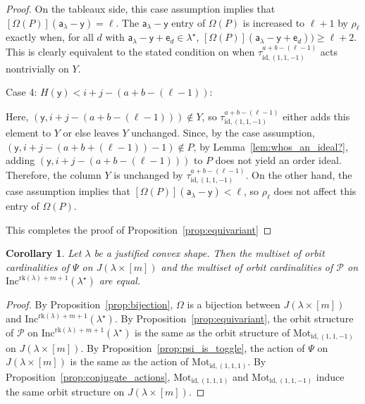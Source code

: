 \documentclass[12pt]{amsart}
\newcommand{\y}{\ensuremath{\mathsf{y}}}
\newcommand{\e}{\ensuremath{\mathsf{e}}}
\newcommand{\aaa}{\ensuremath{\mathsf{a}}}
\newtheorem{corollary}[theorem]{Corollary}
\theoremstyle{definition}
\theoremstyle{remark}
\numberwithin{equation}{section}
\newcommand{\inc}{\ensuremath{\mathrm{Inc}}}
\newcommand{\pro}{\mathcal{P}}
\newcommand{\rank}{\ensuremath{\mathrm{rk}}}
\newcommand{\mot}{\ensuremath{\mathrm{Mot}}}
\begin{document}
\begin{proof}
On the tableaux side, this case assumption implies that $[\Omega(P)](\aaa_\lambda - \y) = \ell$. The $\aaa_\lambda - \y$ entry of $\Omega(P)$ is increased to $\ell+1$ by $\rho_\ell$ exactly when, for all $d$ with $\aaa_\lambda - \y +\e_d \in \lambda^\star$, $[\Omega(P)](\aaa_\lambda - \y + \e_d)) \geq \ell+2$. This is clearly equivalent to the stated condition on when $\tau^{a+b-(\ell-1)}_{\text{id},(1,1,-1)}$ acts nontrivially on $Y$.

\medskip
\noindent
{\sf Case 4: $H(\y) < i+j-(a+b-(\ell-1))$:} 

Here, $(\y,i+j-(a+b-(\ell-1))) \notin Y$, so $\tau^{a+b-(\ell-1)}_{\text{id},(1,1,-1)}$ either adds this element to $Y$ or else leaves $Y$ unchanged. Since, by the case assumption, $(\y,i+j-(a+b+(\ell-1))-1) \notin P$, by Lemma~\ref{lem:whos_an_ideal?}, adding $(\y,i+j-(a+b-(\ell-1)))$ to $P$ does not yield an order ideal. Therefore, the column $Y$ is unchanged by $\tau^{a+b-(\ell-1)}_{\text{id},(1,1,-1)}$. On the other hand, the case assumption implies that $[\Omega(P)](\aaa_\lambda - \y) < \ell$, so $\rho_\ell$ does not affect this entry of $\Omega(P)$. 

\medskip
This completes the proof of Proposition~\ref{prop:equivariant}
\end{proof}

\begin{corollary}
Let $\lambda$ be a justified convex shape.
Then the multiset of orbit cardinalities of $\Psi$ on $J(\lambda \times [m])$ and the multiset of orbit cardinalities of $\pro$ on $\inc^{\rank(\lambda)+ m+1}(\lambda^\star)$ are equal.
\end{corollary}
\begin{proof}
By Proposition~\ref{prop:bijection}, $\Omega$ is a bijection between $J(\lambda \times [m])$ and $\inc^{\rank(\lambda)+ m+1}(\lambda^\star)$. By Proposition~\ref{prop:equivariant}, the orbit structure of $\pro$ on $\inc^{\rank(\lambda)+ m+1}(\lambda^\star)$ is the same as the orbit structure of $\mot_{\text{id},(1,1,-1)}$ on $J(\lambda \times [m])$. By Proposition~\ref{prop:psi_is_toggle}, the action of $\Psi$ on $J(\lambda \times [m])$ is the same as the action of $\mot_{\text{id},(1,1,1)}$. By Proposition~\ref{prop:conjugate_actions}, $\mot_{\text{id},(1,1,1)}$ and $\mot_{\text{id},(1,1,-1)}$ induce the same orbit structure on $J(\lambda \times [m])$.
\end{proof}
\end{document}
